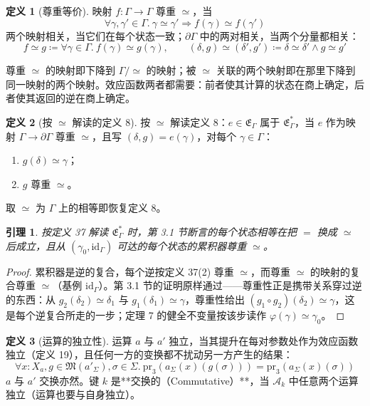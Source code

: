 \documentclass[11pt,a4paper]{article}
\theoremstyle{plain}
\newtheorem{lemma}[theorem]{引理}
\theoremstyle{definition}
\newtheorem{definition}{定义}
\theoremstyle{remark}
\begin{document}
\begin{definition}[尊重等价]
映射 $f : \Gamma \to \Gamma$ 尊重 $\simeq$，当
\[
\forall \gamma, \gamma' \in \Gamma.\ \gamma \simeq \gamma' \Rightarrow f(\gamma) \simeq f(\gamma') \tag{33}
\]
两个映射相关，当它们在每个状态一致；$\partial\Gamma$ 中的两对相关，当两个分量都相关：
\[
f \simeq g \coloneqq \forall \gamma \in \Gamma.\ f(\gamma) \simeq g(\gamma), \qquad
(\delta, g) \simeq (\delta', g') \coloneqq \delta \simeq \delta' \wedge g \simeq g' \tag{34}
\]
\end{definition}

尊重 $\simeq$ 的映射即下降到 $\Gamma/\simeq$ 的映射；被 $\simeq$ 关联的两个映射即在那里下降到同一映射的两个映射。效应函数两者都需要：前者使其计算的状态在商上确定，后者使其返回的逆在商上确定。

\begin{definition}[按 $\simeq$ 解读的定义 8]
按 $\simeq$ 解读定义 8：$e \in \mathfrak{E}_\Gamma$ 属于 $\mathfrak{E}_\Gamma^\ast$，当 $e$ 作为映射 $\Gamma \to \partial\Gamma$ 尊重 $\simeq$，且写 $(\delta, g) = e(\gamma)$，对每个 $\gamma \in \Gamma$：
\begin{enumerate}
\item $g(\delta) \simeq \gamma$；
\item $g$ 尊重 $\simeq$。
\end{enumerate}
取 $\simeq$ 为 $\Gamma$ 上的相等即恢复定义 8。
\end{definition}

\begin{lemma}\label{lem:upto-equivalence}
按定义 37 解读 $\mathfrak{E}_\Gamma^\ast$ 时，第 3.1 节断言的每个状态相等在把 $=$ 换成 $\simeq$ 后成立，且从 $(\gamma_0, \mathrm{id}_\Gamma)$ 可达的每个状态的累积器尊重 $\simeq$。
\end{lemma}

\begin{proof}
累积器是逆的复合，每个逆按定义 37(2) 尊重 $\simeq$，而尊重 $\simeq$ 的映射的复合尊重 $\simeq$（基例 $\mathrm{id}_\Gamma$）。第 3.1 节的证明原样通过——尊重性正是携带关系穿过逆的东西：从 $g_2(\delta_2) \simeq \delta_1$ 与 $g_1(\delta_1) \simeq \gamma$，尊重性给出 $(g_1 \circ g_2)(\delta_2) \simeq \gamma$，这是每个逆复合所走的一步；定理 7 的健全不变量按该步读作 $\varphi(\gamma) \simeq \gamma_0$。
\end{proof}

\begin{definition}[运算的独立性]
运算 $a$ 与 $a'$ 独立，当其提升在每对参数处作为效应函数独立（定义 19），且任何一方的变换都不扰动另一方产生的结果：
\[
\forall x : X_a, g \in \mathfrak{M}(a'_\Sigma), \sigma \in \Sigma.\ \mathrm{pr}_3(a_\Sigma(x)(g(\sigma))) = \mathrm{pr}_3(a_\Sigma(x)(\sigma)) \tag{35}
\]
$a$ 与 $a'$ 交换亦然。键 $k$ 是**交换的（Commutative）**，当 $\mathcal{A}_k$ 中任意两个运算独立（运算也要与自身独立）。
\end{definition}
\end{document}
